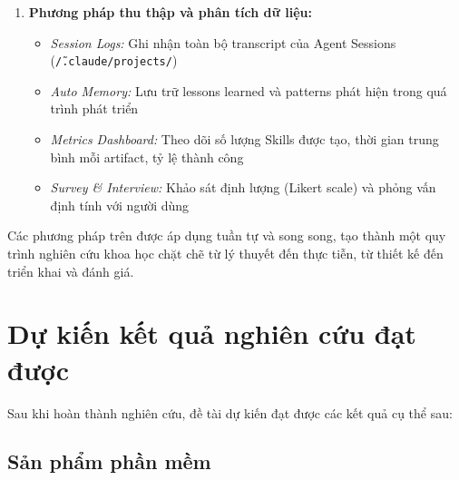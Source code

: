\documentclass[13pt,a4paper,oneside]{extreport}
\numberwithin{equation}{chapter}
\numberwithin{figure}{chapter}
\numberwithin{table}{chapter}
\begin{document}
\begin{enumerate}
    \item \textbf{Phương pháp thu thập và phân tích dữ liệu:}
    \begin{itemize}
        \item \textit{Session Logs:} Ghi nhận toàn bộ transcript của Agent Sessions (\texttt{\~/.claude/projects/})
        \item \textit{Auto Memory:} Lưu trữ lessons learned và patterns phát hiện trong quá trình phát triển
        \item \textit{Metrics Dashboard:} Theo dõi số lượng Skills được tạo, thời gian trung bình mỗi artifact, tỷ lệ thành công
        \item \textit{Survey \& Interview:} Khảo sát định lượng (Likert scale) và phỏng vấn định tính với người dùng
    \end{itemize}
\end{enumerate}

Các phương pháp trên được áp dụng tuần tự và song song, tạo thành một quy trình nghiên cứu khoa học chặt chẽ từ lý thuyết đến thực tiễn, từ thiết kế đến triển khai và đánh giá.

\section*{Dự kiến kết quả nghiên cứu đạt được}

Sau khi hoàn thành nghiên cứu, đề tài dự kiến đạt được các kết quả cụ thể sau:

\subsection*{Sản phẩm phần mềm}
\end{document}
